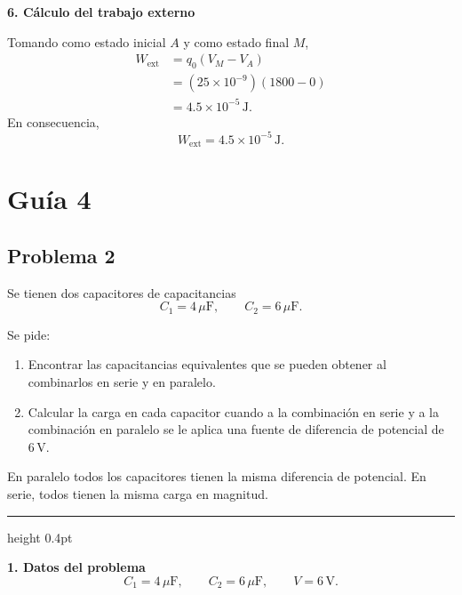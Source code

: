 \documentclass[11pt]{article}
\newcommand{\soluciontitulo}{%
  \par\medskip
  \noindent{\large\bfseries Solución.}\par
  \vspace{0.2em}\hrule height 0.4pt \vspace{0.7em}%
}
\begin{document}
\textbf{6. C\'alculo del trabajo externo}

Tomando como estado inicial $A$ y como estado final $M$,
\begin{align*}
    W_{\text{ext}}
    &=q_0(V_M-V_A)\\
    &=(25\times 10^{-9})(1800-0)\\
    &=4.5\times 10^{-5}\,\text{J}.
\end{align*}
En consecuencia,
\begin{equation*}
    \boxed{W_{\text{ext}}=4.5\times 10^{-5}\,\text{J}}.
\end{equation*}

\newpage

\section*{Gu\'ia 4}

\subsection*{Problema 2}
Se tienen dos capacitores de capacitancias
\begin{equation*}
    C_1=4\,\mu\text{F},
    \qquad
    C_2=6\,\mu\text{F}.
\end{equation*}

Se pide:
\begin{enumerate}[label=(\alph*)]
    \item Encontrar las capacitancias equivalentes que se pueden obtener al combinarlos en serie y en paralelo.
    \item Calcular la carga en cada capacitor cuando a la combinaci\'on en serie y a la combinaci\'on en paralelo se le aplica una fuente de diferencia de potencial de $6\,\text{V}$.
\end{enumerate}

\begin{comentario}
En paralelo todos los capacitores tienen la misma diferencia de potencial. En serie, todos tienen la misma carga en magnitud.
\end{comentario}



\soluciontitulo

\textbf{1. Datos del problema}
\begin{equation*}
    C_1=4\,\mu\text{F},
    \qquad
    C_2=6\,\mu\text{F},
    \qquad
    V=6\,\text{V}.
\end{equation*}
\end{document}
